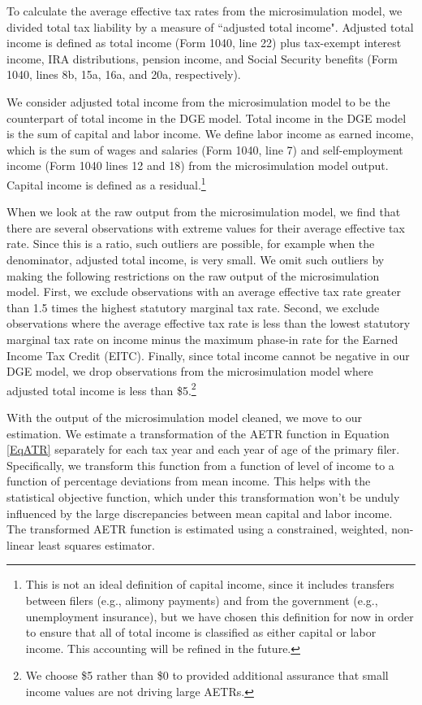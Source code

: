 \documentclass[letterpaper,12pt]{article}
\theoremstyle{definition}
\begin{document}
\begin{spacing}{1.5}
 To calculate the average effective tax rates from the microsimulation model, we divided total tax liability by a measure of ``adjusted total income".  Adjusted total income is defined as total income (Form 1040, line 22) plus tax-exempt interest income, IRA distributions, pension income, and Social Security benefits (Form 1040, lines 8b, 15a, 16a, and 20a, respectively).  
 
 We consider adjusted total income from the microsimulation model to be the counterpart of total income in the DGE model.  Total income in the DGE model is the sum of capital and labor income.  We define labor income as earned income, which is the sum of wages and salaries (Form 1040, line 7) and self-employment income (Form 1040 lines 12 and 18) from the microsimulation model output.  Capital income is defined as a residual.\footnote{This is not an ideal definition of capital income, since it includes transfers between filers (e.g., alimony payments) and from the government (e.g., unemployment insurance), but we have chosen this definition for now in order to ensure that all of total income is classified as either capital or labor income. This accounting will be refined in the future.}
 
When we look at the raw output from the microsimulation model, we find that there are several observations with extreme values for their average effective tax rate.  Since this is a ratio, such outliers are possible, for example when the denominator, adjusted total income, is very small.  We omit such outliers by making the following restrictions on the raw output of the microsimulation model.  First, we exclude observations with an average effective tax rate greater than 1.5 times the highest statutory marginal tax rate.  Second, we exclude observations where the average effective tax rate is less than the lowest statutory marginal tax rate on income minus the maximum phase-in rate for the Earned Income Tax Credit (EITC).  Finally, since total income cannot be negative in our DGE model, we drop observations from the microsimulation model where adjusted total income is less than \$5.\footnote{We choose \$5 rather than \$0 to provided additional assurance that small income values are not driving large AETRs.} 

With the output of the microsimulation model cleaned, we move to our estimation.  We estimate a transformation of the AETR function in Equation \ref{EqATR} separately for each tax year and each year of age of the primary filer.  Specifically, we transform this function from a function of level of income to a function of percentage deviations from mean income.  This helps with the statistical objective function, which under this transformation won't be unduly influenced by the large discrepancies between mean capital and labor income.  The transformed AETR function is estimated using a constrained, weighted, non-linear least squares estimator.  


\end{spacing}
\end{document}
